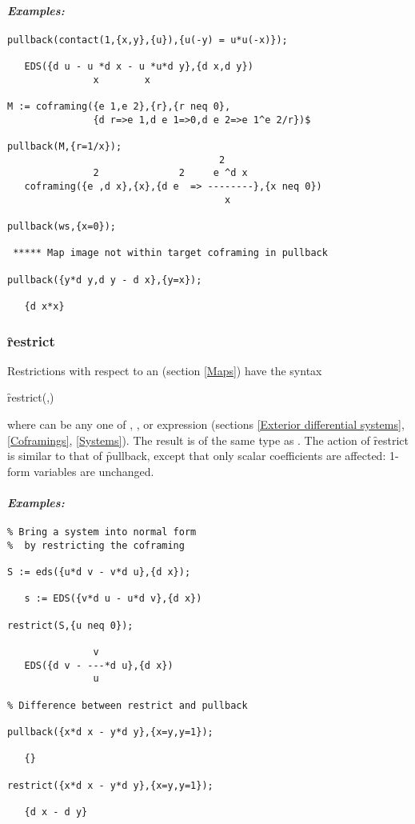 \paragraph{\textit{Examples:}}
\begin{verbatim}
pullback(contact(1,{x,y},{u}),{u(-y) = u*u(-x)});

   EDS({d u - u *d x - u *u*d y},{d x,d y})
               x        x

M := coframing({e 1,e 2},{r},{r neq 0},
               {d r=>e 1,d e 1=>0,d e 2=>e 1^e 2/r})$

pullback(M,{r=1/x});
                                     2
               2              2     e ^d x
   coframing({e ,d x},{x},{d e  => --------},{x neq 0})
                                      x

pullback(ws,{x=0});

 ***** Map image not within target coframing in pullback

pullback({y*d y,d y - d x},{y=x});

   {d x*x}
\end{verbatim}

\subsubsection{\f{restrict}}
\label{restrict}

\hypertarget{operator:RESTRICT}{}
Restrictions with respect to an   (section \ref{Maps}) have the
syntax
\begin{syntax}
	\f{restrict}(,)
\end{syntax}
where  can be any one of , ,
 or  expression (sections \ref{Exterior
differential systems}, \ref{Coframings}, \ref{Systems}). The result is of
the same type as . The action of \f{restrict} is similar to that
of \f{pullback}, except that only scalar coefficients are affected: 1-form
variables are unchanged.

\paragraph{\textit{Examples:}}
\begin{verbatim}
% Bring a system into normal form
%  by restricting the coframing

S := eds({u*d v - v*d u},{d x});

   s := EDS({v*d u - u*d v},{d x})

restrict(S,{u neq 0});

               v
   EDS({d v - ---*d u},{d x})
               u

% Difference between restrict and pullback

pullback({x*d x - y*d y},{x=y,y=1});

   {}

restrict({x*d x - y*d y},{x=y,y=1});

   {d x - d y}
\end{verbatim}

